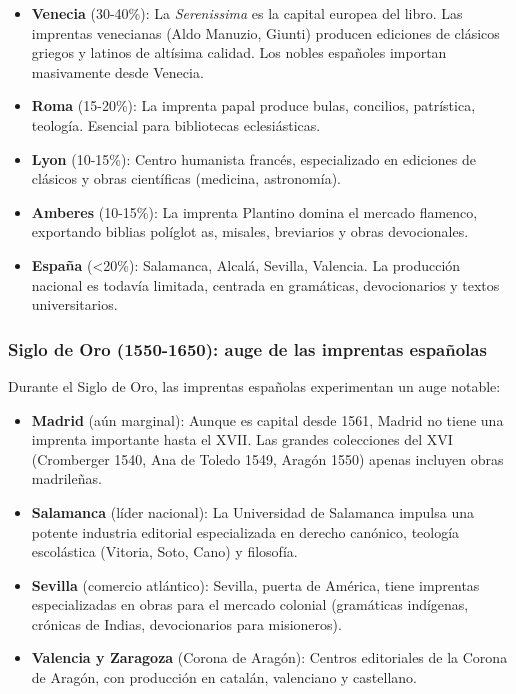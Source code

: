 \documentclass[11pt,a4paper]{article}
\begin{document}
\begin{itemize}
\item \textbf{Venecia} (30-40\%): La \textit{Serenissima} es la capital europea del libro. Las imprentas venecianas (Aldo Manuzio, Giunti) producen ediciones de clásicos griegos y latinos de altísima calidad. Los nobles españoles importan masivamente desde Venecia.

\item \textbf{Roma} (15-20\%): La imprenta papal produce bulas, concilios, patrística, teología. Esencial para bibliotecas eclesiásticas.

\item \textbf{Lyon} (10-15\%): Centro humanista francés, especializado en ediciones de clásicos y obras científicas (medicina, astronomía).

\item \textbf{Amberes} (10-15\%): La imprenta Plantino domina el mercado flamenco, exportando biblias políglot as, misales, breviarios y obras devocionales.

\item \textbf{España} (<20\%): Salamanca, Alcalá, Sevilla, Valencia. La producción nacional es todavía limitada, centrada en gramáticas, devocionarios y textos universitarios.
\end{itemize}

\subsubsection{Siglo de Oro (1550-1650): auge de las imprentas españolas}

Durante el Siglo de Oro, las imprentas españolas experimentan un auge notable:

\begin{itemize}
\item \textbf{Madrid} (aún marginal): Aunque es capital desde 1561, Madrid no tiene una imprenta importante hasta el XVII. Las grandes colecciones del XVI (Cromberger 1540, Ana de Toledo 1549, Aragón 1550) apenas incluyen obras madrileñas.

\item \textbf{Salamanca} (líder nacional): La Universidad de Salamanca impulsa una potente industria editorial especializada en derecho canónico, teología escolástica (Vitoria, Soto, Cano) y filosofía.

\item \textbf{Sevilla} (comercio atlántico): Sevilla, puerta de América, tiene imprentas especializadas en obras para el mercado colonial (gramáticas indígenas, crónicas de Indias, devocionarios para misioneros).

\item \textbf{Valencia y Zaragoza} (Corona de Aragón): Centros editoriales de la Corona de Aragón, con producción en catalán, valenciano y castellano.
\end{itemize}
\end{document}
